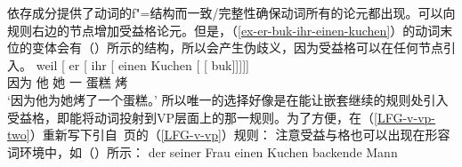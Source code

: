 \ea
\label{lfg-vp-regel-two}
\z
依存成分提供了动词的f"=结构而一致/完整性确保动词所有的论元都出现。可以向规则右边的节点增加受益格论元。但是，（\ref{ex-er-buk-ihr-einen-kuchen}）的动词末位的变体会有（）所示的结构，所以会产生伪歧义，因为受益格可以在任何节点引入。
\ea
\gll weil    [ er [ ihr [ einen Kuchen [ [ buk]]]]]\\
     因为 {}        他 {}        她 {}        一 蛋糕       {}        {}       烤\\
\glt `因为他为她烤了一个蛋糕。'
\z
所以唯一的选择好像是在能让嵌套继续的规则处引入受益格，即能将动词投射到VP层面上的那一规则。为了方便，在（\ref{LFG-v-vp-two}）重新写下引自~\pageref{LFG-v-vp}页的（\ref{LFG-v-vp}）规则：
\ea
\label{LFG-v-vp-two}
\z
注意受益与格也可以出现在形容词环境中，如（）所示：
\eal
\ex
\gll der seiner Frau einen Kuchen backende Mann\\
